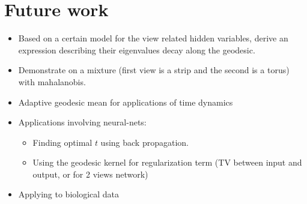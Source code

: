 \documentclass[]{article}
\theoremstyle{definition}
\begin{document}
	\section{Future work}
	
	\begin{itemize}
		\item Based on a certain model for the view related hidden variables, derive an expression describing their eigenvalues decay along the geodesic.
		\item Demonstrate on a mixture (first view is a strip and the second is a torus) with mahalanobis.
		
		\item Adaptive geodesic mean for applications of time dynamics
		\item Applications involving neural-nets:
		\begin{itemize}
			\item Finding optimal $t$ using back propagation.
			\item Using the geodesic kernel for regularization term (TV between input and output, or for 2 views network)
		\end{itemize} 
		\item Applying to biological data
	\end{itemize}
	
	
	
	
\end{document}

